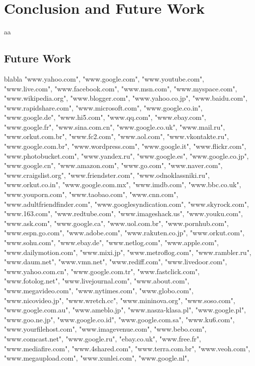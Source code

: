 \chapter{Conclusion and Future Work} \label{chap:conc}
aa

\section{Future Work}
blabla
"www.yahoo.com",
	"www.google.com",
	"www.youtube.com",
	"www.live.com",
	"www.facebook.com",
	"www.msn.com",
	"www.myspace.com",
	"www.wikipedia.org",
	"www.blogger.com",
	"www.yahoo.co.jp",
	"www.baidu.com",
	"www.rapidshare.com",
	"www.microsoft.com",
	"www.google.co.in",
	"www.google.de",
	"www.hi5.com",
	"www.qq.com",
	"www.ebay.com",
	"www.google.fr",
	"www.sina.com.cn",
	"www.google.co.uk",
	"www.mail.ru",
	"www.orkut.com.br",
	"www.fc2.com",
	"www.aol.com",
	"www.vkontakte.ru",
	"www.google.com.br",
	"www.wordpress.com",
	"www.google.it",
	"www.flickr.com",
	"www.photobucket.com",
	"www.yandex.ru",
	"www.google.es",
	"www.google.co.jp",
	"www.google.cn",
	"www.amazon.com",
	"www.go.com",
	"www.naver.com",
	"www.craigslist.org",
	"www.friendster.com",
	"www.odnoklassniki.ru",
	"www.orkut.co.in",
	"www.google.com.mx",
	"www.imdb.com",
	"www.bbc.co.uk",
	"www.youporn.com",
	"www.taobao.com",
	"www.cnn.com",
	"www.adultfriendfinder.com",
	"www.googlesyndication.com",
	"www.skyrock.com",
	"www.163.com",
	"www.redtube.com",
	"www.imageshack.us",
	"www.youku.com",
	"www.ask.com",
	"www.google.ca",
	"www.uol.com.br",
	"www.pornhub.com",
	"www.espn.go.com",
	"www.adobe.com",
	"www.rakuten.co.jp",
	"www.orkut.com",
	"www.sohu.com",
	"www.ebay.de",
	"www.netlog.com",
	"www.apple.com",
	"www.dailymotion.com",
	"www.mixi.jp",
	"www.metroflog.com",
	"www.rambler.ru",
	"www.daum.net",
	"www.vmn.net",
	"www.rediff.com",
	"www.livedoor.com",
	"www.yahoo.com.cn",
	"www.google.com.tr",
	"www.fastclick.com",
	"www.fotolog.net",
	"www.livejournal.com",
	"www.about.com",
	"www.megavideo.com",
	"www.nytimes.com",
	"www.globo.com",
	"www.nicovideo.jp",
	"www.wretch.cc",
	"www.mininova.org",
	"www.soso.com",
	"www.google.com.au",
	"www.ameblo.jp",
	"www.nasza-klasa.pl",
	"www.google.pl",
	"www.goo.ne.jp",
	"www.google.co.id",
	"www.google.com.sa",
	"www.ku6.com",
	"www.yourfilehost.com",
	"www.imagevenue.com",
	"www.bebo.com",
	"www.comcast.net",
	"www.google.ru",
	"ebay.co.uk",
	"www.free.fr",
	"www.mediafire.com",
	"www.4shared.com",
	"www.terra.com.br",
	"www.veoh.com",
	"www.megaupload.com",
	"www.xunlei.com",
	"www.google.nl",
